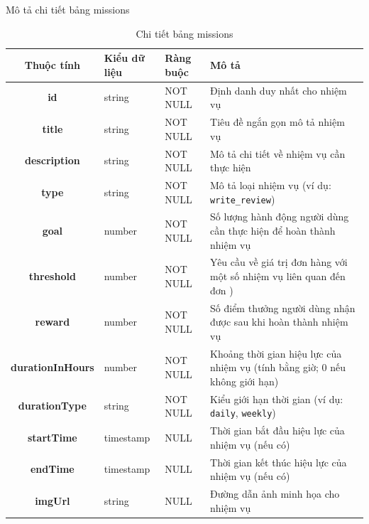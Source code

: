 \documentclass[../DoAn.tex]{subfiles}
\begin{document}
Mô tả chi tiết bảng missions
\begin{table}[H]
\centering
\begin{tabular}{|c|l|l|p{7cm}|}
\hline
\textbf{Thuộc tính} & \textbf{Kiểu dữ liệu} & \textbf{Ràng buộc} & \textbf{Mô tả} \\ \hline
\textbf{id} & string & NOT NULL & Định danh duy nhất cho nhiệm vụ \\ \hline
\textbf{title} & string & NOT NULL & Tiêu đề ngắn gọn mô tả nhiệm vụ \\ \hline
\textbf{description} & string & NOT NULL & Mô tả chi tiết về nhiệm vụ cần thực hiện \\ \hline
\textbf{type} & string & NOT NULL & Mô tả loại nhiệm vụ (ví dụ: \texttt{write\_review}) \\ \hline
\textbf{goal} & number & NOT NULL & Số lượng hành động người dùng cần thực hiện để hoàn thành nhiệm vụ \\ \hline
\textbf{threshold} & number & NOT NULL & Yêu cầu về giá trị đơn hàng với một số nhiệm vụ liên quan đến đơn ) \\ \hline
\textbf{reward} & number & NOT NULL & Số điểm thưởng người dùng nhận được sau khi hoàn thành nhiệm vụ \\ \hline
\textbf{durationInHours} & number & NOT NULL & Khoảng thời gian hiệu lực của nhiệm vụ (tính bằng giờ; 0 nếu không giới hạn) \\ \hline
\textbf{durationType} & string & NOT NULL & Kiểu giới hạn thời gian (ví dụ: \texttt{daily}, \texttt{weekly}) \\ \hline
\textbf{startTime} & timestamp & NULL & Thời gian bắt đầu hiệu lực của nhiệm vụ (nếu có) \\ \hline
\textbf{endTime} & timestamp & NULL & Thời gian kết thúc hiệu lực của nhiệm vụ (nếu có) \\ \hline
\textbf{imgUrl} & string & NULL & Đường dẫn ảnh minh họa cho nhiệm vụ \\ \hline
\end{tabular}
\caption{Chi tiết bảng missions}
\label{tab:missionsTable}
\end{table}
\end{document}
